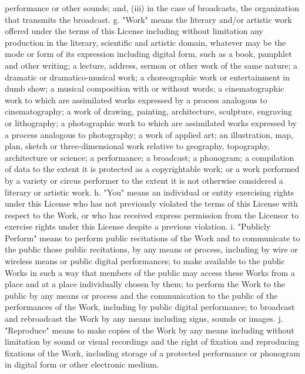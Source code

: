     performance or other sounds; and, (iii) in the case of broadcasts, the
    organization that transmits the broadcast.
 g. "Work" means the literary and/or artistic work offered under the terms
    of this License including without limitation any production in the
    literary, scientific and artistic domain, whatever may be the mode or
    form of its expression including digital form, such as a book,
    pamphlet and other writing; a lecture, address, sermon or other work
    of the same nature; a dramatic or dramatico-musical work; a
    choreographic work or entertainment in dumb show; a musical
    composition with or without words; a cinematographic work to which are
    assimilated works expressed by a process analogous to cinematography;
    a work of drawing, painting, architecture, sculpture, engraving or
    lithography; a photographic work to which are assimilated works
    expressed by a process analogous to photography; a work of applied
    art; an illustration, map, plan, sketch or three-dimensional work
    relative to geography, topography, architecture or science; a
    performance; a broadcast; a phonogram; a compilation of data to the
    extent it is protected as a copyrightable work; or a work performed by
    a variety or circus performer to the extent it is not otherwise
    considered a literary or artistic work.
 h. "You" means an individual or entity exercising rights under this
    License who has not previously violated the terms of this License with
    respect to the Work, or who has received express permission from the
    Licensor to exercise rights under this License despite a previous
    violation.
 i. "Publicly Perform" means to perform public recitations of the Work and
    to communicate to the public those public recitations, by any means or
    process, including by wire or wireless means or public digital
    performances; to make available to the public Works in such a way that
    members of the public may access these Works from a place and at a
    place individually chosen by them; to perform the Work to the public
    by any means or process and the communication to the public of the
    performances of the Work, including by public digital performance; to
    broadcast and rebroadcast the Work by any means including signs,
    sounds or images.
 j. "Reproduce" means to make copies of the Work by any means including
    without limitation by sound or visual recordings and the right of
    fixation and reproducing fixations of the Work, including storage of a
    protected performance or phonogram in digital form or other electronic
    medium.

